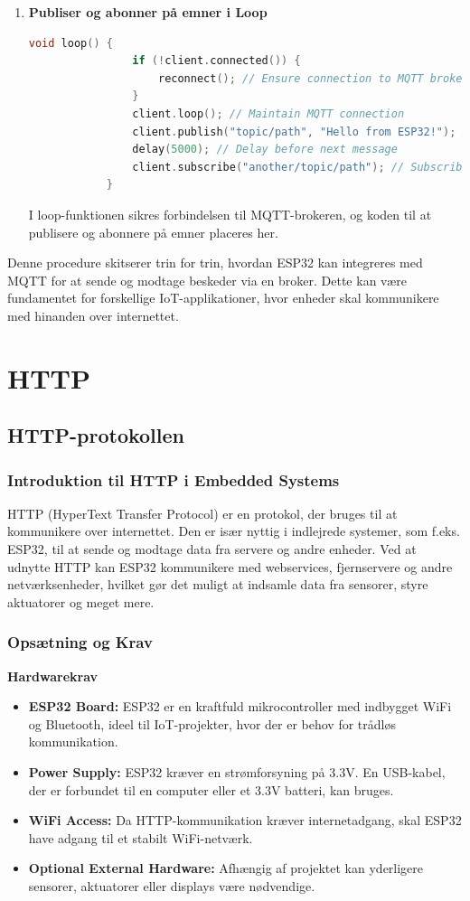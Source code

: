 \documentclass[12pt,a4paper]{book}
\begin{document}
\begin{enumerate}
		\item \textbf{Publiser og abonner på emner i Loop}
		\begin{lstlisting}[language=C++, caption=Syntaks]
			void loop() {
				if (!client.connected()) {
					reconnect(); // Ensure connection to MQTT broker
				}
				client.loop(); // Maintain MQTT connection
				client.publish("topic/path", "Hello from ESP32!"); // Publish a message
				delay(5000); // Delay before next message
				client.subscribe("another/topic/path"); // Subscribe to a topic
			}
		\end{lstlisting}
		I loop-funktionen sikres forbindelsen til MQTT-brokeren, og koden til at publisere og abonnere på emner placeres her.
	\end{enumerate}
	Denne procedure skitserer trin for trin, hvordan ESP32 kan integreres med MQTT for at sende og modtage beskeder via en broker. Dette kan være fundamentet for forskellige IoT-applikationer, hvor enheder skal kommunikere med hinanden over internettet.
	
	\chapter{HTTP}
	\section{HTTP-protokollen}
	
	\subsection*{Introduktion til HTTP i Embedded Systems}
	HTTP (HyperText Transfer Protocol) er en protokol, der bruges til at kommunikere over internettet. Den er især nyttig i indlejrede systemer, som f.eks. ESP32, til at sende og modtage data fra servere og andre enheder. Ved at udnytte HTTP kan ESP32 kommunikere med webservices, fjernservere og andre netværksenheder, hvilket gør det muligt at indsamle data fra sensorer, styre aktuatorer og meget mere.
	
	\subsection*{Opsætning og Krav}
	
	\textbf{Hardwarekrav}
	\begin{itemize}
		\item \textbf{ESP32 Board:} ESP32 er en kraftfuld mikrocontroller med indbygget WiFi og Bluetooth, ideel til IoT-projekter, hvor der er behov for trådløs kommunikation.
		\item \textbf{Power Supply:} ESP32 kræver en strømforsyning på 3.3V. En USB-kabel, der er forbundet til en computer eller et 3.3V batteri, kan bruges.
		\item \textbf{WiFi Access:} Da HTTP-kommunikation kræver internetadgang, skal ESP32 have adgang til et stabilt WiFi-netværk.
		\item \textbf{Optional External Hardware:} Afhængig af projektet kan yderligere sensorer, aktuatorer eller displays være nødvendige.
	\end{itemize}
	
\end{document}
